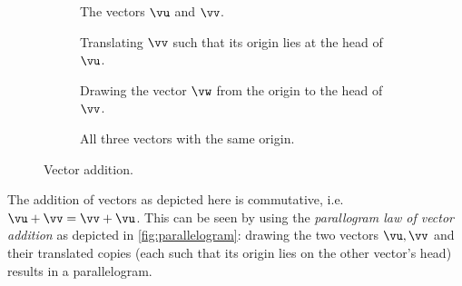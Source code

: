 \renewcommand\thesubfigure{\arabic{subfigure}}
\begin{figure}[h]
	\centering
	 \begin{subfigure}[t]{0.45\textwidth}
		\centering
		\caption{The vectors $\vu$ and $\vv$.}
	\end{subfigure}
	\hfill
	\begin{subfigure}[t]{0.45\textwidth}
		\centering
		\caption{Translating $\vv$ such that its origin lies at the head of $\vu$.}
	\end{subfigure}

	\vspace{3em}
	\begin{subfigure}[t]{0.45\textwidth}
		\centering
		\caption{Drawing the vector $\vw$ from the origin to the head of $\vv$.}
	\end{subfigure}
	\hfill
	\begin{subfigure}[t]{0.45\textwidth}
		\centering
		\caption{All three vectors with the same origin.}
	\end{subfigure}
	\caption{Vector addition.}
	\label{fig:vector addition geometric}
\end{figure}

The addition of vectors as depicted here is commutative, i.e. $\vu+\vv = \vv+\vu$. This can be seen by using the \emph{parallogram law of vector addition} as depicted in \autoref{fig:parallelogram}: drawing the two vectors $\vu, \vv$ and their translated copies (each such that its origin lies on the other vector's head) results in a parallelogram.

